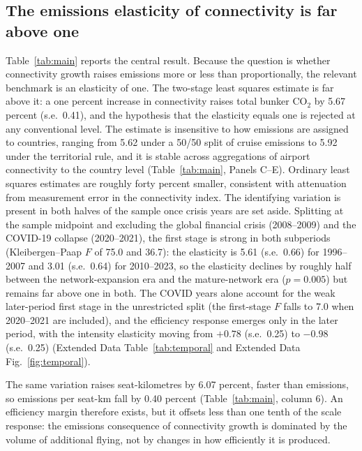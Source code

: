 \documentclass[12pt]{article}
\begin{document}
\subsection*{The emissions elasticity of connectivity is far above one}
Table~\ref{tab:main} reports the central result. Because the question is
whether connectivity growth raises emissions more or less than
proportionally, the relevant benchmark is an elasticity of one. The
two-stage least squares estimate is far above it: a one percent increase in
connectivity raises total bunker CO$_2$ by 5.67 percent (s.e.\ 0.41), and
the hypothesis that the elasticity equals one is rejected at any
conventional level. The estimate is insensitive to how emissions are
assigned to countries, ranging from 5.62 under a 50/50 split of cruise
emissions to 5.92 under the territorial rule, and it is stable across
aggregations of airport connectivity to the country level
(Table~\ref{tab:main}, Panels C--E). Ordinary least squares estimates are
roughly forty percent smaller, consistent with attenuation from measurement
error in the connectivity index. The identifying variation is present in
both halves of the sample once crisis years are set aside. Splitting at the
sample midpoint and excluding the global financial crisis (2008--2009) and
the COVID-19 collapse (2020--2021), the first stage is strong in both
subperiods (Kleibergen--Paap $F$ of 75.0 and 36.7): the elasticity is 5.61
(s.e.\ 0.66) for 1996--2007 and 3.01 (s.e.\ 0.64) for 2010--2023, so the
elasticity declines by roughly half between the network-expansion era and
the mature-network era ($p = 0.005$) but remains far above one in both. The
COVID years alone account for the weak later-period first stage in the
unrestricted split (the first-stage $F$ falls to 7.0 when 2020--2021 are
included), and the efficiency response emerges only in the later period,
with the intensity elasticity moving from $+0.78$ (s.e.\ 0.25) to $-0.98$
(s.e.\ 0.25) (Extended Data Table~\ref{tab:temporal} and Extended Data
Fig.~\ref{fig:temporal}).

The same variation raises seat-kilometres by 6.07 percent, faster than
emissions, so emissions per seat-km fall by 0.40 percent
(Table~\ref{tab:main}, column 6). An efficiency margin therefore exists,
but it offsets less than one tenth of the scale response: the emissions
consequence of connectivity growth is dominated by the volume of additional
flying, not by changes in how efficiently it is produced.
\end{document}
